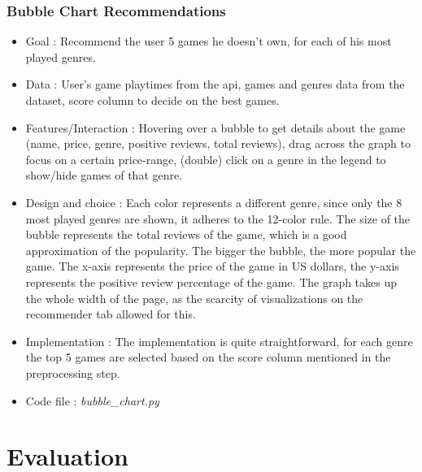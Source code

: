 \documentclass{article}
\begin{document}
	\subsubsection{Bubble Chart Recommendations}
	\begin{itemize}
		\item Goal : Recommend the user 5 games he doesn't own, for each of his most played genres.
		\item Data : User's game playtimes from the api, games and genres data from the dataset, score column to decide on the best games.
		\item Features/Interaction : Hovering over a bubble to get details about the game (name, price, genre, positive reviews, total reviews), drag across the graph to focus on a certain price-range, (double) click on a genre in the legend to show/hide games of that genre. 
		\item Design and choice : Each color represents a different genre, since only the 8 most played genres are shown, it adheres to the 12-color rule. The size of the bubble represents the total reviews of the game, which is a good approximation of the popularity. The bigger the bubble, the more popular the game. The x-axis represents the price of the game in US dollars, the y-axis represents the positive review percentage of the game. The graph takes up the whole width of the page, as the scarcity of visualizations on the recommender tab allowed for this.
		\item Implementation : The implementation is quite straightforward, for each genre the top 5 games are selected based on the score column mentioned in the preprocessing step.
		\item Code file : \textit{bubble\_chart.py}
	\end{itemize}

	\section{Evaluation}
	
	
	\newpage
\end{document}
